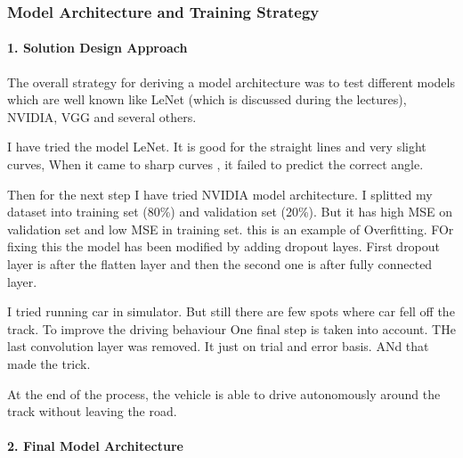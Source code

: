\documentclass[11pt]{article}
\begin{document}
\hypertarget{model-architecture-and-training-strategy-1}{%
\subsubsection{Model Architecture and Training
Strategy}\label{model-architecture-and-training-strategy-1}}

\hypertarget{solution-design-approach}{%
\paragraph{1. Solution Design Approach}\label{solution-design-approach}}

The overall strategy for deriving a model architecture was to test
different models which are well known like LeNet (which is discussed
during the lectures), NVIDIA, VGG and several others.

I have tried the model LeNet. It is good for the straight lines and very
slight curves, When it came to sharp curves , it failed to predict the
correct angle.

Then for the next step I have tried NVIDIA model architecture. I
splitted my dataset into training set (80\%) and validation set (20\%).
But it has high MSE on validation set and low MSE in training set. this
is an example of Overfitting. FOr fixing this the model has been
modified by adding dropout layes. First dropout layer is after the
flatten layer and then the second one is after fully connected layer.

I tried running car in simulator. But still there are few spots where
car fell off the track. To improve the driving behaviour One final step
is taken into account. THe last convolution layer was removed. It just
on trial and error basis. ANd that made the trick.

At the end of the process, the vehicle is able to drive autonomously
around the track without leaving the road.

\hypertarget{final-model-architecture}{%
\paragraph{2. Final Model Architecture}\label{final-model-architecture}}
\end{document}
